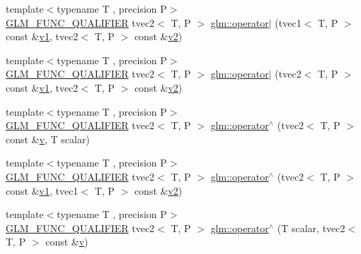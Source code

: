 \begin{DoxyCompactItemize}
\item 
{\footnotesize template$<$typename T , precision P$>$ }\\\mbox{\hyperlink{setup_8hpp_a33fdea6f91c5f834105f7415e2a64407}{G\+L\+M\+\_\+\+F\+U\+N\+C\+\_\+\+Q\+U\+A\+L\+I\+F\+I\+ER}} tvec2$<$ T, P $>$ \mbox{\hyperlink{namespaceglm_af5155397639849fa1295a1d622312456}{glm\+::operator$\vert$}} (tvec1$<$ T, P $>$ const \&\mbox{\hyperlink{glad_8h_a0779c3b73f9aa3a0ac5b0139b5d291d9}{v1}}, tvec2$<$ T, P $>$ const \&\mbox{\hyperlink{glad_8h_a9a09a1837922b2b806f4589096a52049}{v2}})
\item 
{\footnotesize template$<$typename T , precision P$>$ }\\\mbox{\hyperlink{setup_8hpp_a33fdea6f91c5f834105f7415e2a64407}{G\+L\+M\+\_\+\+F\+U\+N\+C\+\_\+\+Q\+U\+A\+L\+I\+F\+I\+ER}} tvec2$<$ T, P $>$ \mbox{\hyperlink{namespaceglm_a1eb7592cbac1c87e296b97b91808e15b}{glm\+::operator$\vert$}} (tvec2$<$ T, P $>$ const \&\mbox{\hyperlink{glad_8h_a0779c3b73f9aa3a0ac5b0139b5d291d9}{v1}}, tvec2$<$ T, P $>$ const \&\mbox{\hyperlink{glad_8h_a9a09a1837922b2b806f4589096a52049}{v2}})
\item 
{\footnotesize template$<$typename T , precision P$>$ }\\\mbox{\hyperlink{setup_8hpp_a33fdea6f91c5f834105f7415e2a64407}{G\+L\+M\+\_\+\+F\+U\+N\+C\+\_\+\+Q\+U\+A\+L\+I\+F\+I\+ER}} tvec2$<$ T, P $>$ \mbox{\hyperlink{namespaceglm_a1894258cbdab343a766b0f631e7197f1}{glm\+::operator$^\wedge$}} (tvec2$<$ T, P $>$ const \&\mbox{\hyperlink{glad_8h_a14cfbe2fc2234f5504618905b69d1e06}{v}}, T scalar)
\item 
{\footnotesize template$<$typename T , precision P$>$ }\\\mbox{\hyperlink{setup_8hpp_a33fdea6f91c5f834105f7415e2a64407}{G\+L\+M\+\_\+\+F\+U\+N\+C\+\_\+\+Q\+U\+A\+L\+I\+F\+I\+ER}} tvec2$<$ T, P $>$ \mbox{\hyperlink{namespaceglm_afea32f367dd1f4f3bc26aecc9a6d97d0}{glm\+::operator$^\wedge$}} (tvec2$<$ T, P $>$ const \&\mbox{\hyperlink{glad_8h_a0779c3b73f9aa3a0ac5b0139b5d291d9}{v1}}, tvec1$<$ T, P $>$ const \&\mbox{\hyperlink{glad_8h_a9a09a1837922b2b806f4589096a52049}{v2}})
\item 
{\footnotesize template$<$typename T , precision P$>$ }\\\mbox{\hyperlink{setup_8hpp_a33fdea6f91c5f834105f7415e2a64407}{G\+L\+M\+\_\+\+F\+U\+N\+C\+\_\+\+Q\+U\+A\+L\+I\+F\+I\+ER}} tvec2$<$ T, P $>$ \mbox{\hyperlink{namespaceglm_aeb5eec61cdf9c9a14471d1ae759f1e18}{glm\+::operator$^\wedge$}} (T scalar, tvec2$<$ T, P $>$ const \&\mbox{\hyperlink{glad_8h_a14cfbe2fc2234f5504618905b69d1e06}{v}})

\end{DoxyCompactItemize}
